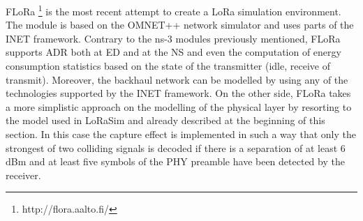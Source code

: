 FLoRa \footnote{http://flora.aalto.fi/} is the most recent attempt to create a LoRa simulation environment. The module is based on the OMNET++ network simulator and uses parts of the INET framework. Contrary to the ns-3 modules previously mentioned, FLoRa supports \gls{ADR} both at \gls{ED} and at the \gls{NS} and even the computation of energy consumption statistics based on the state of the transmitter (idle, receive of transmit). Moreover, the backhaul network can be modelled by using any of the technologies supported by the INET framework. On the other side, FLoRa takes a more simplistic approach on the modelling of the physical layer by resorting to the model used in LoRaSim and already described at the beginning of this section. In this case the capture effect is implemented in such a way that only the strongest of two colliding signals is decoded if there is a separation of at least 6 dBm and at least five symbols of the PHY preamble have been detected by the receiver.



   
